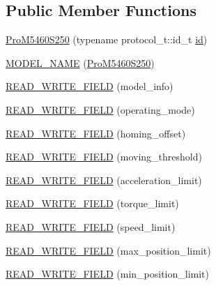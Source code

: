 \subsection*{Public Member Functions}
\begin{DoxyCompactItemize}
\item 
\hyperlink{classdynamixel_1_1servos_1_1_pro_m5460_s250_ab6654ef454e1159aec5b5530e5fa24aa}{Pro\+M5460\+S250} (typename protocol\+\_\+t\+::id\+\_\+t \hyperlink{classdynamixel_1_1servos_1_1_servo_a2d022081672e25a7bb57b76706e1cc57}{id})
\item 
\hyperlink{classdynamixel_1_1servos_1_1_pro_m5460_s250_a3de076aa893c2c7ee4d5cb44b9c3290c}{M\+O\+D\+E\+L\+\_\+\+N\+A\+ME} (\hyperlink{classdynamixel_1_1servos_1_1_pro_m5460_s250}{Pro\+M5460\+S250})
\item 
\hyperlink{classdynamixel_1_1servos_1_1_pro_m5460_s250_a76e2307edb9cc8b19bb9be7694edb586}{R\+E\+A\+D\+\_\+\+W\+R\+I\+T\+E\+\_\+\+F\+I\+E\+LD} (model\+\_\+info)
\item 
\hyperlink{classdynamixel_1_1servos_1_1_pro_m5460_s250_a8778c8a5bbb21134a8db27d50664b88b}{R\+E\+A\+D\+\_\+\+W\+R\+I\+T\+E\+\_\+\+F\+I\+E\+LD} (operating\+\_\+mode)
\item 
\hyperlink{classdynamixel_1_1servos_1_1_pro_m5460_s250_a3b2df77acb2c22a725cf7402194bc22e}{R\+E\+A\+D\+\_\+\+W\+R\+I\+T\+E\+\_\+\+F\+I\+E\+LD} (homing\+\_\+offset)
\item 
\hyperlink{classdynamixel_1_1servos_1_1_pro_m5460_s250_a721cbeed3a07bd240376136e20061549}{R\+E\+A\+D\+\_\+\+W\+R\+I\+T\+E\+\_\+\+F\+I\+E\+LD} (moving\+\_\+threshold)
\item 
\hyperlink{classdynamixel_1_1servos_1_1_pro_m5460_s250_ac997e390079e5cdda47c2a1307d6285b}{R\+E\+A\+D\+\_\+\+W\+R\+I\+T\+E\+\_\+\+F\+I\+E\+LD} (acceleration\+\_\+limit)
\item 
\hyperlink{classdynamixel_1_1servos_1_1_pro_m5460_s250_afa0c42e9a857962a1f6390c19f5071d4}{R\+E\+A\+D\+\_\+\+W\+R\+I\+T\+E\+\_\+\+F\+I\+E\+LD} (torque\+\_\+limit)
\item 
\hyperlink{classdynamixel_1_1servos_1_1_pro_m5460_s250_ac2caece24901f4a6ab7358bc29f4da33}{R\+E\+A\+D\+\_\+\+W\+R\+I\+T\+E\+\_\+\+F\+I\+E\+LD} (speed\+\_\+limit)
\item 
\hyperlink{classdynamixel_1_1servos_1_1_pro_m5460_s250_a6af98e9cad0fc385e01dc011ea6fe473}{R\+E\+A\+D\+\_\+\+W\+R\+I\+T\+E\+\_\+\+F\+I\+E\+LD} (max\+\_\+position\+\_\+limit)
\item 
\hyperlink{classdynamixel_1_1servos_1_1_pro_m5460_s250_adcac24cea2a39d6b02a7289dd352a3f2}{R\+E\+A\+D\+\_\+\+W\+R\+I\+T\+E\+\_\+\+F\+I\+E\+LD} (min\+\_\+position\+\_\+limit)

\end{DoxyCompactItemize}

